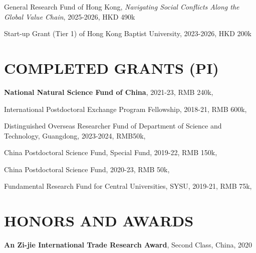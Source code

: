 \documentclass{res}
\begin{document}
\begin{resume}
General Research Fund of Hong Kong,   \textit{Navigating Social Conflicts Along the Global Value Chain}, 2025-2026, HKD 490k  \\
 \vspace{-1.6em}

Start-up Grant (Tier 1) of Hong Kong Baptist University, 2023-2026, HKD 200k \\
 \vspace{-1.6em}




 
  \section{COMPLETED GRANTS (PI)}    
 \vspace{0.8em}  


    
\textbf{National Natural Science Fund of China},  2021-23, RMB 240k,  \\
 \vspace{-1.6em}

International Postdoctoral Exchange Program Fellowship,  2018-21, RMB 600k,  \\
 \vspace{-1.6em}
 
 Distinguished Overseas Researcher Fund of Department of Science and Technology, Guangdong, 2023-2024, RMB50k,  \\
 \vspace{-1.6em}

China Postdoctoral Science Fund, Special Fund,  2019-22, RMB 150k,   \\
 \vspace{-1.6em}
 
China Postdoctoral Science Fund,  2020-23,  RMB 50k, \\
 \vspace{-1.6em}

Fundamental Research Fund for Central Universities, SYSU, 2019-21, RMB 75k,  
 

 \section{HONORS AND AWARDS} 
 \vspace{0.8em}            
\textbf{An Zi-jie International Trade Research Award}, Second Class, China, 2020\\
 \vspace{-1.6em}


\end{resume}
\end{document}
